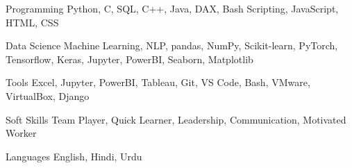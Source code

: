 

\begin{cvskills}
	
	\cvskill
	{Programming} %
	{Python, C,  SQL, C++, Java, DAX, Bash Scripting, JavaScript, HTML, CSS} %
	
	\cvskill
	{Data Science} %
	{Machine Learning,  NLP, pandas, NumPy, Scikit-learn,  PyTorch, Tensorflow, Keras, Jupyter, PowerBI, Seaborn, Matplotlib } %
	
	\cvskill
	{Tools} %
	{Excel, Jupyter, PowerBI, Tableau, Git, VS Code, Bash, VMware, VirtualBox, Django} %
	
	\cvskill
	{Soft Skills} %
	{Team Player, Quick Learner, Leadership, Communication, Motivated Worker} %
	
	\cvskill
	{Languages} %
	{English, Hindi, Urdu} %
	
\end{cvskills}
